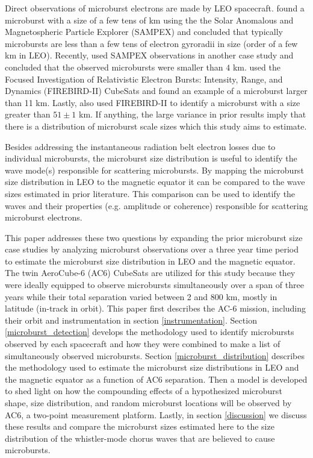 Direct observations of microburst electrons are made by LEO spacecraft. \citet{Blake1996} found a microburst with a size of a few tens of km using the the Solar Anomalous and Magnetospheric Particle Explorer (SAMPEX) and concluded that typically microbursts are less than a few tens of electron gyroradii in size (order of a few km in LEO). Recently, \citet{Dietrich2010} used SAMPEX observations in another case study and concluded that the observed microbursts were smaller than $4$ km. \citet{Crew2016} used the Focused Investigation of Relativistic Electron Bursts: Intensity, Range, and Dynamics (FIREBIRD-II) CubeSats and found an example of a microburst larger than 11 km. Lastly, \citet{Shumko2018a} also used FIREBIRD-II to identify a microburst with a size greater than $ 51 \pm 1$ km. If anything, the large variance in prior results imply that there is a distribution of microburst scale sizes which this study aims to estimate.

Besides addressing the instantaneous radiation belt electron losses due to individual microbursts, the microburst size distribution is useful to identify the wave mode(s) responsible for scattering microbursts. By mapping the microburst size distribution in LEO to the magnetic equator it can be compared to the wave sizes estimated in prior literature. This comparison can be used to identify the waves and their properties (e.g. amplitude or coherence) responsible for scattering microburst electrons.

This paper addresses these two questions by expanding the prior microburst size case studies by analyzing microburst observations over a three year time period to estimate the microburst size distribution in LEO and the magnetic equator. The twin AeroCube-6 (AC6) CubeSats are utilized for this study because they were ideally equipped to observe microbursts simultaneously over a span of three years while their total separation varied between 2 and 800 km, mostly in latitude (in-track in orbit). This paper first describes the AC-6 mission, including their orbit and instrumentation in section \ref{instrumentation}. Section \ref{microburst_detection} develops the methodology used to identify microbursts observed by each spacecraft and how they were combined to make a list of simultaneously observed microbursts. Section \ref{microburst_distribution} describes the methodology used to estimate the microburst size distributions in LEO and the magnetic equator as a function of AC6 separation. Then a model is developed to shed light on how the compounding effects of a hypothesized microburst shape, size distribution, and random microburst locations will be observed by AC6, a two-point measurement platform. Lastly, in section \ref{discussion} we discuss these results and compare the microburst sizes estimated here to the size distribution of the whistler-mode chorus waves that are believed to cause microbursts. 

